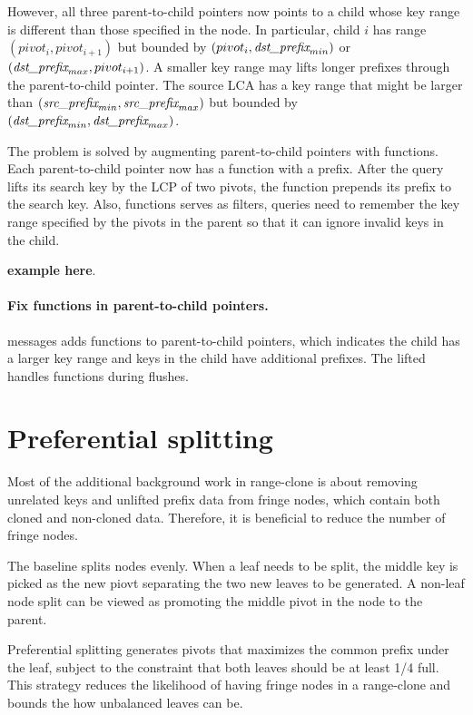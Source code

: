 However, all three parent-to-child pointers now points to a child whose key
range is different than those specified in the node.
In particular, child $i$ has range $(pivot_{i},pivot_{i+1})$ but bounded by
$(pivot_{i},\textit{dst\_prefix}_{min})$ or $(\textit{dst\_prefix}_{max}, pivot_{i+1})$.
A smaller key range may lifts longer prefixes through the parent-to-child
pointer.
The source LCA has a key range that might be larger than
$(\textit{src\_prefix}_{min}, \textit{src\_prefix}_{max})$ but bounded by $(\textit{dst\_prefix}_{min},\textit{dst\_prefix}_{max})$.

The problem is solved by augmenting parent-to-child pointers with \xf functions.
Each parent-to-child pointer now has a \xf function with a prefix.
After the query lifts its search key by the LCP of two pivots, the \xf function
prepends its prefix to the search key.
Also, \xf functions serves as filters, queries need to remember the key range
specified by the pivots in the parent so that it can ignore invalid keys in the
child.

\textbf{example here}.

\paragraph{Fix \xf functions in parent-to-child pointers.}
\goto messages adds \xf functions to parent-to-child pointers, which indicates
the child has a larger key range and keys in the child have additional prefixes.
The lifted \bedag handles \xf functions during flushes.

\section{Preferential splitting}

Most of the additional background work in range-clone is about removing
unrelated keys and unlifted prefix data from fringe nodes, which
contain both cloned and non-cloned data.
Therefore, it is beneficial to reduce the number of fringe nodes.

The baseline \bet splits nodes evenly.
When a leaf needs to be split, the middle key is picked as the new piovt
separating the two new leaves to be generated.
A non-leaf node split can be viewed as promoting the middle pivot in the node to
the parent.

Preferential splitting generates pivots that maximizes the common prefix under
the leaf, subject to the constraint that both leaves should be at least 1/4
full.
This strategy reduces the likelihood of having fringe nodes
in a range-clone and bounds the how unbalanced leaves can be.

